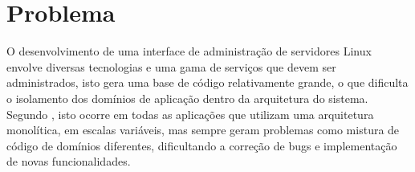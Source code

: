 \section{Problema}

  O desenvolvimento de uma interface de administração de servidores Linux
  envolve diversas tecnologias e uma gama de serviços que devem ser
  administrados, isto gera uma base de código relativamente grande, o que
  dificulta o isolamento dos domínios de aplicação dentro da arquitetura
  do sistema. Segundo , isto ocorre em todas as aplicações
  que utilizam uma arquitetura monolítica, em escalas variáveis, mas sempre
  geram problemas como mistura de código de domínios diferentes, dificultando
  a correção de bugs e implementação de novas funcionalidades.
